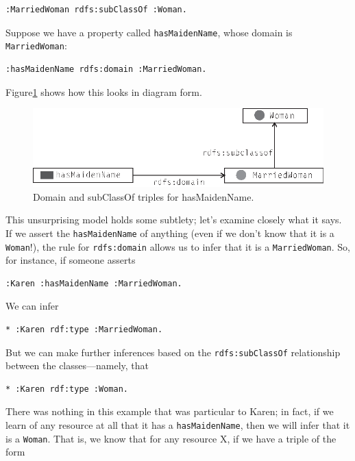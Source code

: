 \begin{lstlisting}
:MarriedWoman rdfs:subClassOf :Woman.
\end{lstlisting}

Suppose we have a property called \texttt{hasMaidenName}, whose domain is
\texttt{MarriedWoman}:

\begin{lstlisting}
:hasMaidenName rdfs:domain :MarriedWoman.
\end{lstlisting}

Figure\ref{fig:ch8.2} shows how this looks in diagram form.

\begin{figure}
\centering
\includegraphics[width=5in]{media/ch8/f08-2.eps}
\caption{Domain and subClassOf triples for hasMaidenName.}
\label{fig:ch8.2}
\end{figure}


This unsurprising model holds some subtlety; let's examine closely what
it says. If we assert the \texttt{hasMaidenName} of anything (even if we don't
know that it is a \texttt{Woman}!), the rule for \texttt{rdfs:domain} allows us to infer
that it is a \texttt{MarriedWoman}. So, for instance, if someone asserts

\begin{lstlisting}
:Karen :hasMaidenName :MarriedWoman.
\end{lstlisting}

We can infer

\begin{lstlisting}
* :Karen rdf:type :MarriedWoman.
\end{lstlisting}

But we can make further inferences based on the \texttt{rdfs:subClassOf}
relationship between the classes---namely, that

\begin{lstlisting}
* :Karen rdf:type :Woman.
\end{lstlisting}

There was nothing in this example that was particular to Karen; in fact,
if we learn of any resource at all that it has a \texttt{hasMaidenName}, then we
will infer that it is a \texttt{Woman}. That is, we know that for any resource X,
if we have a triple of the form

